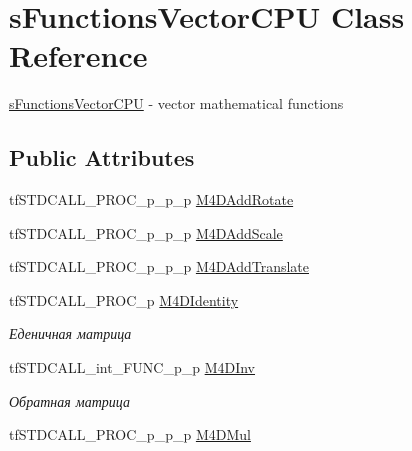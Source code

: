 \hypertarget{structs_functions_vector_c_p_u}{\section{s\-Functions\-Vector\-C\-P\-U Class Reference}
\label{structs_functions_vector_c_p_u}
}


\hyperlink{structs_functions_vector_c_p_u}{s\-Functions\-Vector\-C\-P\-U} -\/ vector mathematical functions  


\subsection*{Public Attributes}
\begin{DoxyCompactItemize}
\item 
tf\-S\-T\-D\-C\-A\-L\-L\-\_\-\-P\-R\-O\-C\-\_\-p\-\_\-p\-\_\-p \hyperlink{structs_functions_vector_c_p_u_ad0cf2fc7891819bba1bc885e152beb4a}{M4\-D\-Add\-Rotate}
\item 
tf\-S\-T\-D\-C\-A\-L\-L\-\_\-\-P\-R\-O\-C\-\_\-p\-\_\-p\-\_\-p \hyperlink{structs_functions_vector_c_p_u_a1e74049519a89b009ed9803ad861c6c6}{M4\-D\-Add\-Scale}
\item 
tf\-S\-T\-D\-C\-A\-L\-L\-\_\-\-P\-R\-O\-C\-\_\-p\-\_\-p\-\_\-p \hyperlink{structs_functions_vector_c_p_u_a1af3b2830ab4713b5e0ef98e29b88fa7}{M4\-D\-Add\-Translate}
\item 
\hypertarget{structs_functions_vector_c_p_u_a9edb0aa384b33ac877e10cf6824bab4a}{tf\-S\-T\-D\-C\-A\-L\-L\-\_\-\-P\-R\-O\-C\-\_\-p \hyperlink{structs_functions_vector_c_p_u_a9edb0aa384b33ac877e10cf6824bab4a}{M4\-D\-Identity}}\label{structs_functions_vector_c_p_u_a9edb0aa384b33ac877e10cf6824bab4a}

\begin{DoxyCompactList}\small\item\em Еденичная матрица \end{DoxyCompactList}\item 
\hypertarget{structs_functions_vector_c_p_u_ac3b83117d95d27299fbcbff4ebc0763a}{tf\-S\-T\-D\-C\-A\-L\-L\-\_\-int\-\_\-\-F\-U\-N\-C\-\_\-p\-\_\-p \hyperlink{structs_functions_vector_c_p_u_ac3b83117d95d27299fbcbff4ebc0763a}{M4\-D\-Inv}}\label{structs_functions_vector_c_p_u_ac3b83117d95d27299fbcbff4ebc0763a}

\begin{DoxyCompactList}\small\item\em Обратная матрица \end{DoxyCompactList}\item 
\hypertarget{structs_functions_vector_c_p_u_a50d5bd9db250c32d416e65961491c41f}{tf\-S\-T\-D\-C\-A\-L\-L\-\_\-\-P\-R\-O\-C\-\_\-p\-\_\-p\-\_\-p \hyperlink{structs_functions_vector_c_p_u_a50d5bd9db250c32d416e65961491c41f}{M4\-D\-Mul}}\label{structs_functions_vector_c_p_u_a50d5bd9db250c32d416e65961491c41f}


\end{DoxyCompactItemize}
